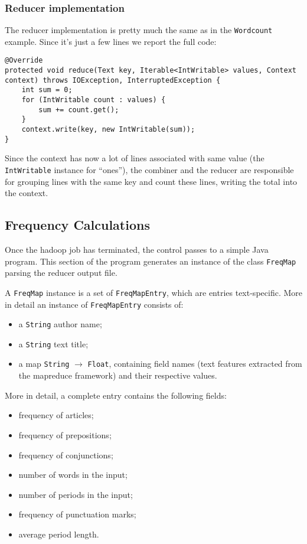 \documentclass[a4paper,11pt, twoside]{article}
\begin{document}
	\subsubsection{Reducer implementation}
	The reducer implementation is pretty much the same as in the \lstinline|Wordcount| example. Since it's just a few lines we report the full code:
	\begin{lstlisting}[firstnumber=135, caption={Reduce method}, captionpos=b]
@Override
protected void reduce(Text key, Iterable<IntWritable> values, Context context) throws IOException, InterruptedException {
	int sum = 0;
	for (IntWritable count : values) {
		sum += count.get();
	}
	context.write(key, new IntWritable(sum));
}
	\end{lstlisting}
	
	Since the context has now a lot of lines associated with same value (the \lstinline|IntWritable| instance for ``ones''), the combiner and the reducer are responsible for grouping lines with the same key and count these lines, writing the total into the context.
	
	
	\subsection{Frequency Calculations}
	Once the hadoop job has terminated, the control passes to a simple Java program. This section of the program generates an instance of the class \lstinline|FreqMap| parsing the reducer output file.
	
	A \lstinline|FreqMap| instance is a set of \lstinline|FreqMapEntry|, which are entries text-specific. More in detail an instance of \lstinline|FreqMapEntry| consists of: \begin{itemize}
		\item a \lstinline|String| author name;
		\item a \lstinline|String| text title;
		\item a map \lstinline|String| $\to$ \lstinline|Float|, containing field names (text features extracted from the mapreduce framework) and their respective values.
	\end{itemize}

	More in detail, a complete entry contains the following fields: \begin{itemize}
		\item frequency of articles;
		\item frequency of prepositions;
		\item frequency of conjunctions;
		\item number of words in the input;
		\item number of periods in the input;
		\item frequency of punctuation marks;
		\item average period length.
	\end{itemize}
\end{document}
